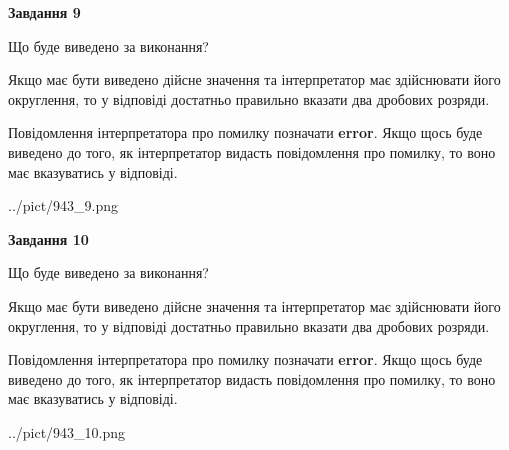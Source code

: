 \documentclass[12pt, ukrainian]{article}
\begin{document}
{\begin {Large}
{\begin {center}\textbf{Завдання 9}\end {center}}\par
Що буде виведено за виконання? \par

Якщо має бути виведено дійсне значення та інтерпретатор має здійснювати його округлення, 
то у відповіді достатньо правильно вказати два дробових розряди.

Повідомлення інтерпретатора про помилку позначати \textbf{error}.
Якщо щось буде виведено до того, як інтерпретатор видасть повідомлення про помилку, 
то воно має вказуватись у відповіді. \par

\begin{center}
	{../pict/943_9.png}
\end{center}
\newpage

{\begin {center}\textbf{Завдання 10}\end {center}}\par
Що буде виведено за виконання? \par

Якщо має бути виведено дійсне значення та інтерпретатор має здійснювати його округлення, 
то у відповіді достатньо правильно вказати два дробових розряди.

Повідомлення інтерпретатора про помилку позначати \textbf{error}.
Якщо щось буде виведено до того, як інтерпретатор видасть повідомлення про помилку, 
то воно має вказуватись у відповіді. \par

\begin{center}
	{../pict/943_10.png}
\end{center}
\newpage

\end {Large}}
\end{document}
